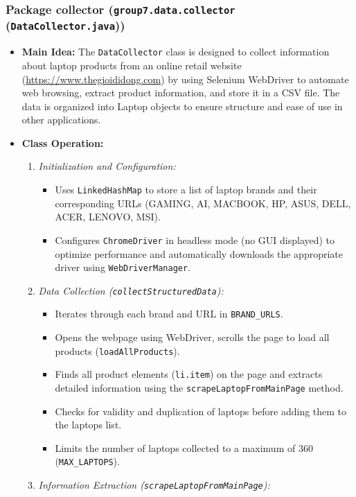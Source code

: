 \documentclass{article}
\begin{document}
\subsubsection{Package collector (\texttt{group7.data.collector} (\texttt{DataCollector.java}))}
\begin{itemize}
    \item \textbf{Main Idea:} The \texttt{DataCollector} class is designed to collect information about laptop products from an online retail website (\url{https://www.thegioididong.com}) by using Selenium WebDriver to automate web browsing, extract product information, and store it in a CSV file. The data is organized into Laptop objects to ensure structure and ease of use in other applications.
    \item \textbf{Class Operation:}
    \begin{enumerate}
        \item \textit{Initialization and Configuration:}
        \begin{itemize}
            \item Uses \texttt{LinkedHashMap} to store a list of laptop brands and their corresponding URLs (GAMING, AI, MACBOOK, HP, ASUS, DELL, ACER, LENOVO, MSI).
            \item Configures \texttt{ChromeDriver} in headless mode (no GUI displayed) to optimize performance and automatically downloads the appropriate driver using \texttt{WebDriverManager}.
        \end{itemize}
        \item \textit{Data Collection (\texttt{collectStructuredData}):}
        \begin{itemize}
            \item Iterates through each brand and URL in \texttt{BRAND\_URLS}.
            \item Opens the webpage using WebDriver, scrolls the page to load all products (\texttt{loadAllProducts}).
            \item Finds all product elements (\texttt{li.item}) on the page and extracts detailed information using the \texttt{scrapeLaptopFromMainPage} method.
            \item Checks for validity and duplication of laptops before adding them to the laptops list.
            \item Limits the number of laptops collected to a maximum of 360 (\texttt{MAX\_LAPTOPS}).
        \end{itemize}
        \item \textit{Information Extraction (\texttt{scrapeLaptopFromMainPage}):}

\end{enumerate}
\end{itemize}
\end{document}
